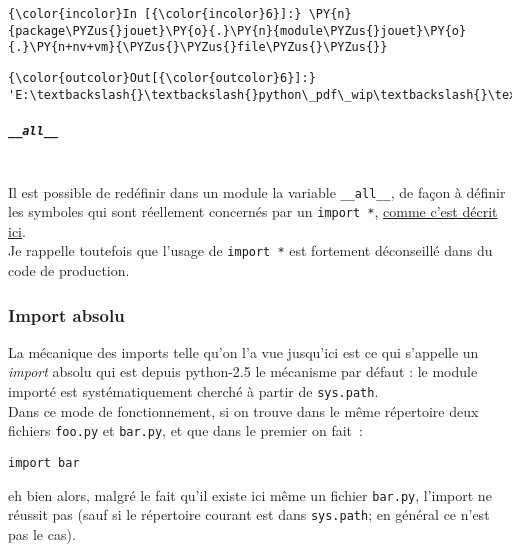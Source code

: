     \begin{Verbatim}[commandchars=\\\{\}]
{\color{incolor}In [{\color{incolor}6}]:} \PY{n}{package\PYZus{}jouet}\PY{o}{.}\PY{n}{module\PYZus{}jouet}\PY{o}{.}\PY{n+nv+vm}{\PYZus{}\PYZus{}file\PYZus{}\PYZus{}}
\end{Verbatim}


\begin{Verbatim}[commandchars=\\\{\}]
{\color{outcolor}Out[{\color{outcolor}6}]:} 'E:\textbackslash{}\textbackslash{}python\_pdf\_wip\textbackslash{}\textbackslash{}flotpython\textbackslash{}\textbackslash{}w5\textbackslash{}\textbackslash{}package\_jouet\textbackslash{}\textbackslash{}module\_jouet.py'
\end{Verbatim}
            
    \hypertarget{all__}{%
\subparagraph{\texorpdfstring{\texttt{\_\_all\_\_}}{\_\_all\_\_}\\\\}\label{all__}}

    Il est possible de redéfinir dans un module la variable
\texttt{\_\_all\_\_}, de façon à définir les symboles qui sont
réellement concernés par un \texttt{import\ *},
\href{https://docs.python.org/3/tutorial/modules.html\#importing-from-a-package}{comme
c'est décrit ici}.\\

Je rappelle toutefois que l'usage de \texttt{import\ *} est fortement
déconseillé dans du code de production.

    \hypertarget{import-absolu}{%
\subsubsection{Import absolu}\label{import-absolu}}

    La mécanique des imports telle qu'on l'a vue jusqu'ici est ce qui
s'appelle un \emph{import} absolu qui est depuis python-2.5 le mécanisme
par défaut : le module importé est systématiquement cherché à partir de
\texttt{sys.path}.\\

Dans ce mode de fonctionnement, si on trouve dans le même répertoire
deux fichiers \texttt{foo.py} et \texttt{bar.py}, et que dans le premier
on fait~:

\begin{verbatim}
import bar
\end{verbatim}

eh bien alors, malgré le fait qu'il existe ici même un fichier
\texttt{bar.py}, l'import ne réussit pas (sauf si le répertoire courant
est dans \texttt{sys.path}; en général ce n'est pas le cas).

